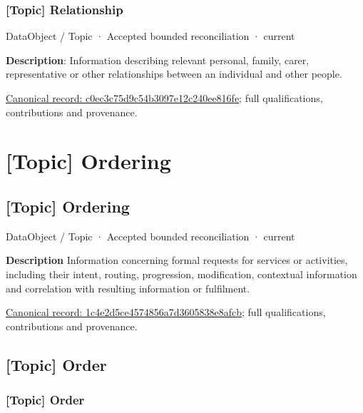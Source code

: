 \subsubsection{[Topic] Relationship}

\label{element:c0ec3c75d9c54b3097e12c240ee816fe}
{\small DataObject / Topic · Accepted bounded reconciliation · current}\par

\textbf{Description}: Information describing relevant personal, family, carer, representative or other relationships between an individual and other people.


{\footnotesize \href{../../../../continuum/application/data-object/topic/c0ec3c75d9c54b3097e12c240ee816fe.md}{Canonical record: c0ec3c75d9c54b3097e12c240ee816fe}; full qualifications, contributions and provenance.}\par
\section{[Topic] Ordering}

\subsection{[Topic] Ordering}

\label{element:1c4e2d5ce4574856a7d3605838e8afcb}
{\small DataObject / Topic · Accepted bounded reconciliation · current}\par

\textbf{Description}
Information concerning formal requests for services or activities, including their intent, routing, progression, modification, contextual information and correlation with resulting information or fulfilment.


{\footnotesize \href{../../../../continuum/application/data-object/topic/1c4e2d5ce4574856a7d3605838e8afcb.md}{Canonical record: 1c4e2d5ce4574856a7d3605838e8afcb}; full qualifications, contributions and provenance.}\par
\subsection{[Topic] Order}

\subsubsection{[Topic] Order}

